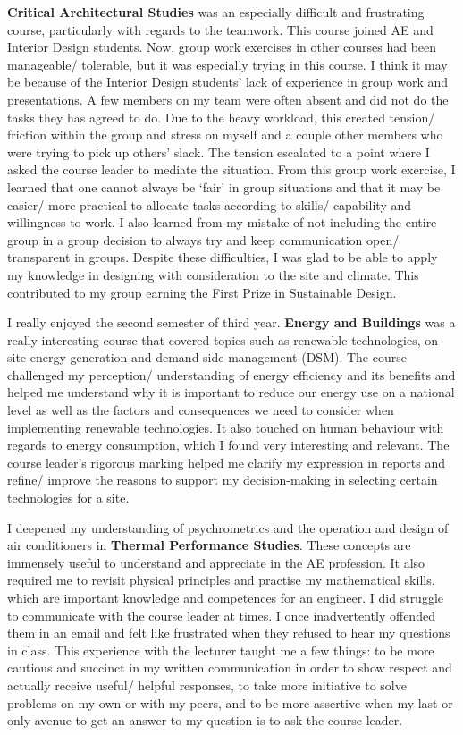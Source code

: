 \textbf{Critical Architectural Studies} was an especially difficult and frustrating course, particularly with regards to the teamwork.
This course joined AE and Interior Design students.
Now, group work exercises in other courses had been manageable/ tolerable, but it was especially trying in this course.
I think it may be because of the Interior Design students' lack of experience in group work and presentations.
A few members on my team were often absent and did not do the tasks they has agreed to do.
Due to the heavy workload, this created tension/ friction within the group and stress on myself and a couple other members who were trying to pick up others' slack.
The tension escalated to a point where I asked the course leader to mediate the situation.
From this group work exercise, I learned that one cannot always be `fair' in group situations and that it may be easier/ more practical to allocate tasks according to skills/ capability and willingness to work.
I also learned from my mistake of not including the entire group in a group decision to always try and keep communication open/ transparent in groups.
Despite these difficulties, I was glad to be able to apply my knowledge in designing with consideration to the site and climate.
This contributed to my group earning the First Prize in Sustainable Design.

I really enjoyed the second semester of third year.
\textbf{Energy and Buildings} was a really interesting course that covered topics such as renewable technologies, on-site energy generation and demand side management (DSM).
The course challenged my perception/ understanding of energy efficiency and its benefits and helped me understand why it is important to reduce our energy use on a national level as well as the factors and consequences we need to consider when implementing renewable technologies.
It also touched on human behaviour with regards to energy consumption, which I found very interesting and relevant.
The course leader's rigorous marking helped me clarify my expression in reports and refine/ improve the reasons to support my decision-making in selecting certain technologies for a site.

I deepened my understanding of psychrometrics and the operation and design of air conditioners in \textbf{Thermal Performance Studies}.
These concepts are immensely useful to understand and appreciate in the AE profession.
It also required me to revisit physical principles and practise my mathematical skills, which are important knowledge and competences for an engineer.
I did struggle to communicate with the course leader at times.
I once inadvertently offended them in an email and felt like frustrated when they refused to hear my questions in class.
This experience with the lecturer taught me a few things: to be more cautious and succinct in my written communication in order to show respect and actually receive useful/ helpful responses, to take more initiative to solve problems on my own or with my peers, and to be more assertive when my last or only avenue to get an answer to my question is to ask the course leader.

